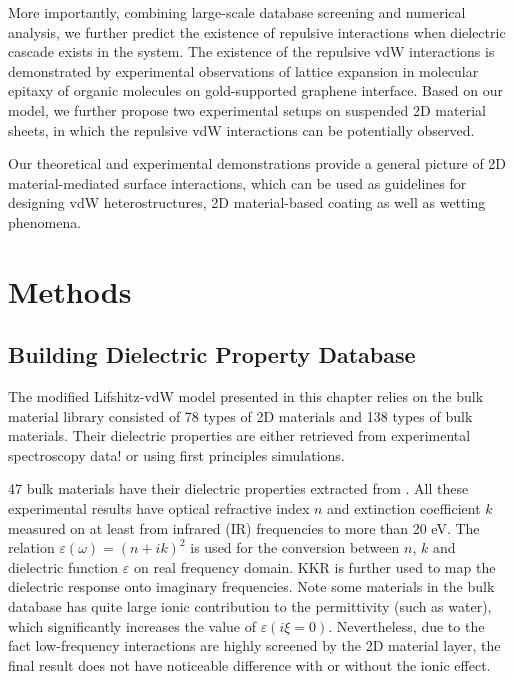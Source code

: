 More importantly, combining large-scale database screening and
numerical analysis, we further predict the existence of repulsive
interactions when dielectric cascade exists in the system. The
existence of the repulsive vdW interactions is demonstrated by
experimental observations of lattice expansion in molecular epitaxy of
organic molecules on gold-supported graphene interface.
%
Based on our model, we further propose two experimental setups on
suspended 2D material sheets, in which the repulsive vdW interactions
can be potentially observed.

Our theoretical and experimental demonstrations provide a general
picture of 2D material-mediated surface interactions, which can be
used as guidelines for designing vdW heterostructures, 2D
material-based coating as well as wetting phenomena.


\section{Methods}
\label{sec:vdw-methods}

\subsection{Building Dielectric Property Database}
\label{sec:retr-exper-diel}

The modified Lifshitz-vdW model presented in this chapter relies on
the bulk material library consisted of 78 types of 2D materials and
138 types of bulk materials. Their dielectric properties are either
retrieved from experimental spectroscopy
data!\cite{Palik_1998_handbook} or using first principles simulations.

47 bulk materials have their dielectric properties extracted from
\parencite{Palik_1998_handbook}.
%
All these experimental results have optical refractive index $n$ and
extinction coefficient $k$ measured on at least from infrared (IR)
frequencies to more than 20 eV.
%
The relation $\varepsilon(\omega) = (n + ik)^{2}$ is used for the
conversion between $n$, $k$ and dielectric function $\varepsilon$ on
real frequency domain. KKR is further used to map the dielectric response onto imaginary frequencies.
%
Note some materials in the bulk database has quite large ionic
contribution to the permittivity (such as water), which significantly
increases the value of $\varepsilon(i \xi = 0)$. Nevertheless, due to
the fact low-frequency interactions are highly screened by the 2D
material layer, the final result does not have noticeable difference
with or without the ionic effect.

